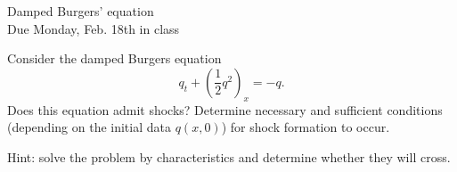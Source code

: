 \documentclass[12pt,english]{article}
\begin{document}
\begin{center}
Damped Burgers' equation \\
Due Monday, Feb. 18th in class
\par\end{center}{\large \par}

\hspace{2cm}

Consider the damped Burgers equation
$$q_t + \left(\frac{1}{2}q^2\right)_x = - q.$$
Does this equation admit shocks?  Determine necessary
and sufficient conditions (depending on the initial data $q(x,0)$) for shock
formation to occur.

Hint: solve the problem by characteristics and determine whether they will cross.
\end{document}
